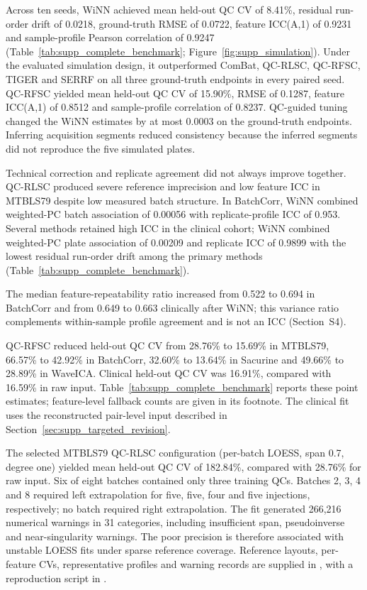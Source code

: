 \documentclass[namedate,webpdf,modern,large,nocrop]{oup-authoring-template}
\begin{document}
\begingroup

\endgroup

Across ten seeds, WiNN achieved mean held-out QC CV of 8.41\%, residual run-order drift of 0.0218, ground-truth RMSE of 0.0722, feature ICC(A,1) of 0.9231 and sample-profile Pearson correlation of 0.9247 (Table~\ref{tab:supp_complete_benchmark}; Figure~\ref{fig:supp_simulation}). Under the evaluated simulation design, it outperformed ComBat, QC-RLSC, QC-RFSC, TIGER and SERRF on all three ground-truth endpoints in every paired seed. QC-RFSC yielded mean held-out QC CV of 15.90\%, RMSE of 0.1287, feature ICC(A,1) of 0.8512 and sample-profile correlation of 0.8237. QC-guided tuning changed the WiNN estimates by at most 0.0003 on the ground-truth endpoints. Inferring acquisition segments reduced consistency because the inferred segments did not reproduce the five simulated plates.

Technical correction and replicate agreement did not always improve together. QC-RLSC produced severe reference imprecision and low feature ICC in MTBLS79 despite low measured batch structure. In BatchCorr, WiNN combined weighted-PC batch association of 0.00056 with replicate-profile ICC of 0.953. Several methods retained high ICC in the clinical cohort; WiNN combined weighted-PC plate association of 0.00209 and replicate ICC of 0.9899 with the lowest residual run-order drift among the primary methods (Table~\ref{tab:supp_complete_benchmark}).

The median feature-repeatability ratio increased from 0.522 to 0.694 in BatchCorr and from 0.649 to 0.663 clinically after WiNN; this variance ratio complements within-sample profile agreement and is not an ICC (Section~S4).

QC-RFSC reduced held-out QC CV from 28.76\% to 15.69\% in MTBLS79, 66.57\% to 42.92\% in BatchCorr, 32.60\% to 13.64\% in Sacurine and 49.66\% to 28.89\% in WaveICA. Clinical held-out QC CV was 16.91\%, compared with 16.59\% in raw input. Table~\ref{tab:supp_complete_benchmark} reports these point estimates; feature-level fallback counts are given in its footnote. The clinical fit uses the reconstructed pair-level input described in Section~\ref{sec:supp_targeted_revision}.

The selected MTBLS79 QC-RLSC configuration (per-batch LOESS, span 0.7, degree one) yielded mean held-out QC CV of 182.84\%, compared with 28.76\% for raw input. Six of eight batches contained only three training QCs. Batches 2, 3, 4 and 8 required left extrapolation for five, five, four and five injections, respectively; no batch required right extrapolation. The fit generated 266,216 numerical warnings in 31 categories, including insufficient span, pseudoinverse and near-singularity warnings. The poor precision is therefore associated with unstable LOESS fits under sparse reference coverage. Reference layouts, per-feature CVs, representative profiles and warning records are supplied in , with a reproduction script in .
\end{document}
